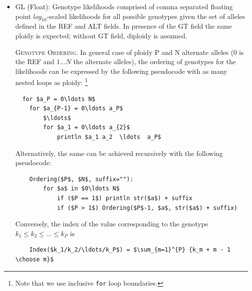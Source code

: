 \documentclass[8pt]{article}
\begin{document}
\begin{itemize}
  \item GL (Float): Genotype likelihoods comprised of comma separated floating point $log_{10}$-scaled likelihoods for all possible genotypes given the set of alleles defined in the REF and ALT fields.
  In presence of the GT field the same ploidy is expected; without GT field, diploidy is assumed.

  \textsc{Genotype Ordering.} \label{genotype-fields:genotype-ordering}
  In general case of ploidy P and N alternate alleles (0 is the REF and $1\ldots N$ the alternate alleles), the ordering of genotypes for the likelihoods can be expressed by the following pseudocode with as many nested loops as ploidy:
  \footnote{Note that we use inclusive \texttt{for} loop boundaries.}
  \begingroup
  \small
  \begin{lstlisting}
  for $a_P = 0\ldots N$
    for $a_{P-1} = 0\ldots a_P$
        $\ldots$
        for $a_1 = 0\ldots a_{2}$
            println $a_1 a_2  \ldots  a_P$
  \end{lstlisting}
  \endgroup

  Alternatively, the same can be achieved recursively with the following pseudocode:
  \begingroup
  \small
  \begin{lstlisting}
    Ordering($P$, $N$, suffix=""):
        for $a$ in $0\ldots N$
            if ($P == 1$) println str($a$) + suffix
            if ($P > 1$) Ordering($P$-1, $a$, str($a$) + suffix)
  \end{lstlisting}
  \endgroup

  Conversely, the index of the value corresponding to the genotype $k_1\le k_2\le\ldots\le k_P$ is
  \begingroup
  \small
  \begin{lstlisting}
    Index($k_1/k_2/\ldots/k_P$) = $\sum_{m=1}^{P} {k_m + m - 1 \choose m}$
  \end{lstlisting}
  \endgroup


\end{itemize}
\end{document}
